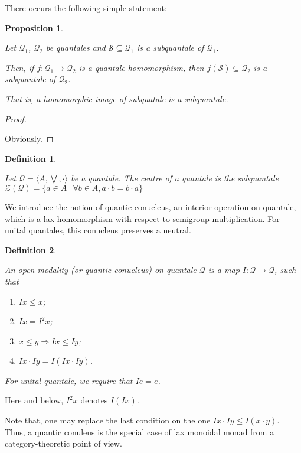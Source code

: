 \documentclass[a4paper]{article}
\theoremstyle{defin}
\newtheorem{defin}{Definition}
\theoremstyle{theorem}
\theoremstyle{prop}
\newtheorem{prop}{Proposition}
\theoremstyle{lemma}
\theoremstyle{ex}
\theoremstyle{col}
\begin{document}
There occurs the following simple statement:

\begin{prop}
  $ $

Let $\mathcal{Q}_1$, $\mathcal{Q}_2$ be quantales and $\mathcal{S} \subseteq \mathcal{Q}_1$ is a subquantale of
$\mathcal{Q}_1$.

Then, if $f : \mathcal{Q}_1 \to \mathcal{Q}_2$ is a quantale homomorphism, then $f(\mathcal{S}) \subseteq \mathcal{Q}_2$ is a subquantale of $\mathcal{Q}_2$.

That is, a homomorphic image of subquatale is a subquantale.
\end{prop}

\begin{proof}
$ $

  Obviously.
\end{proof}

\begin{defin}
$ $

  Let $\mathcal{Q} = \langle A, \bigvee, \cdot \rangle$ be a quantale.
  The centre of a quantale is the subquantale $\mathcal{Z}(\mathcal{Q}) = \{ a \in A \: | \: \forall b \in A, a \cdot b = b \cdot a \}$
\end{defin}

We introduce the notion of quantic conucleus, an interior operation on quantale, which is a lax homomorphism with respect to semigroup multiplication. For unital quantales, this conucleus preserves a neutral.

\begin{defin}
$ $

  An open modality (or quantic conucleus) on quantale $\mathcal{Q}$ is a map $I : \mathcal{Q} \to \mathcal{Q}$, such that

\begin{enumerate}
  \item $I x \leq x$;
  \item $I x = I^2 x$;
  \item $x \leq y \Rightarrow I x \leq I y$;
  \item $I x \cdot I y = I (I x \cdot I y)$.
\end{enumerate}

For unital quantale, we require that $I e = e$.
\end{defin}

Here and below, $I^2 x$ denotes $I (I x)$.

Note that, one may replace the last condition on the one $I x \cdot I y \leq I (x \cdot y)$. Thus, a quantic conuleus is the special case of lax monoidal monad from a category-theoretic point of view.
\end{document}
